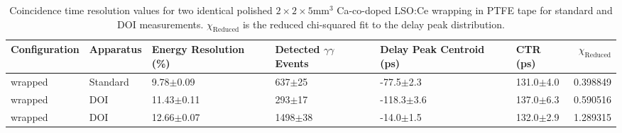 \begin{table}
\caption{\label{tab:referencevals} Coincidence time resolution values for two identical polished $2\times2\times5$mm$^3$ Ca-co-doped LSO:Ce wrapping in PTFE tape for standard and DOI measurements. $\chi_\text{Reduced}$ is the reduced chi-squared fit to the delay peak distribution.}
\begin{tabular}{llllllr}
Configuration &  Apparatus & Energy Resolution (\%) & Detected $\gamma\gamma$ Events & Delay Peak Centroid (ps) & CTR (ps) &  $\chi_\text{Reduced}$ \\
\hline
      wrapped &  Standard &    9.78$\pm$0.09 &   637$\pm$25 &   -77.5$\pm$2.3 &  131.0$\pm$4.0 &    0.398849 \\
      wrapped &       DOI &   11.43$\pm$0.11 &   293$\pm$17 &  -118.3$\pm$3.6 &  137.0$\pm$6.3 &    0.590516 \\
      wrapped &       DOI &   12.66$\pm$0.07 &  1498$\pm$38 &   -14.0$\pm$1.5 &  132.0$\pm$2.9 &    1.289315 \\
\hline
\end{tabular}
\end{table}